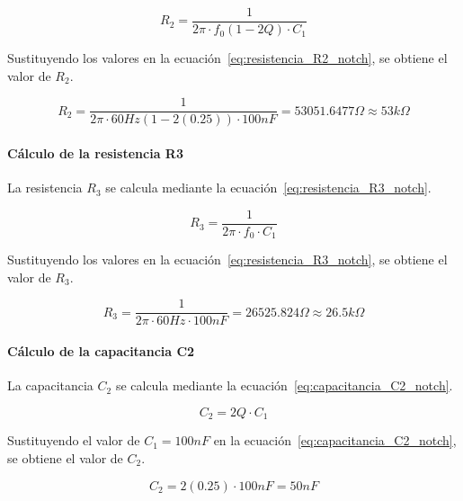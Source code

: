         \begin{equation}
            \label{eq:resistencia_R2_notch}
            R_2 = \frac{1}{2\pi \cdot f_0 (1 - 2Q) \cdot C_1}
        \end{equation}

        Sustituyendo los valores en la ecuación~\ref{eq:resistencia_R2_notch}, se obtiene el valor de $R_2$.

        \begin{equation}
            R_2 = \frac{1}{2\pi \cdot 60 Hz(1 - 2(0.25)) \cdot 100 nF} = 53051.6477 \Omega \approx 53 k\Omega
        \end{equation}

        \paragraph{Cálculo de la resistencia R3}
        La resistencia $R_3$ se calcula mediante la ecuación~\ref{eq:resistencia_R3_notch}.

        \begin{equation}
            \label{eq:resistencia_R3_notch}
            R_3 = \frac{1}{2\pi \cdot f_0 \cdot C_1}
        \end{equation}

        Sustituyendo los valores en la ecuación~\ref{eq:resistencia_R3_notch}, se obtiene el valor de $R_3$.

        \begin{equation}
            R_3 = \frac{1}{2\pi \cdot 60 Hz \cdot 100 nF} = 26525.824 \Omega \approx 26.5 k\Omega
        \end{equation}

        \paragraph{Cálculo de la capacitancia C2}
        La capacitancia $C_2$ se calcula mediante la ecuación~\ref{eq:capacitancia_C2_notch}.

        \begin{equation}
            \label{eq:capacitancia_C2_notch}
            C_2 = 2Q \cdot C_1
        \end{equation}

        Sustituyendo el valor de $C_1 = 100 nF$ en la ecuación~\ref{eq:capacitancia_C2_notch}, se obtiene el valor de $C_2$.

        \begin{equation}
            C_2 = 2(0.25) \cdot 100 nF = 50 nF
        \end{equation}

